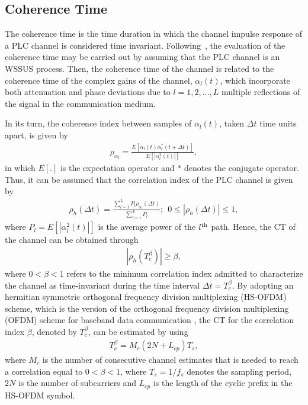 \documentclass[journal]{IEEEtran}
\begin{document}
	\subsection{Coherence Time}
	The coherence time is the time duration in which the channel impulse response of a PLC channel is considered time invariant. Following~\cite{Picorone2014}, the evaluation of the coherence time may be carried out by assuming that the PLC channel is an \ac{WSSUS} process. Then, the coherence time of the channel is related to the coherence time of the complex gains of the channel, $\alpha_l(t)$, which incorporate both attenuation and phase deviations due to $l = 1,2,\ldots,L$ multiple reflections of the signal in the communication medium.  
	
	In its turn, the coherence index between samples of $\alpha_l(t)$, taken $\Delta t$ time units apart, is given by
	\begin{eqnarray}\label{eq-correlindex}
	\rho_{\alpha_l}=\frac{E[\alpha_l(t)\alpha^*_l(t+\Delta t)]}{E[|\alpha_l^2(t)|]},
	\end{eqnarray}
	in which $E[.]$ is the expectation operator and $*$ denotes the conjugate operator. 
	Thus, it can be assumed that the correlation index of the PLC channel is given by
	\begin{eqnarray}\label{eq-correl}
	\rho_{h}(\Delta t)=\frac{\sum_{l=1}^L P_l \rho_{\alpha_l}(\Delta t)}{\sum_{l=1}^L P_l}; \ \ 0\leq |\rho_h(\Delta t)|\leq 1,
	\end{eqnarray}
	where $P_l= E[|\alpha_l^2(t)|]$ is the average power of the  $l^{\rm th}$ path. Hence, the CT of the channel can be obtained through
	\begin{eqnarray}\label{eq-correlfinal}
	|\rho_h(T_c^{\beta})|\geq \beta,
	\end{eqnarray}
	where $0 <\beta < 1$ refers to the minimum correlation index admitted to characterize the channel as time-invariant during the time interval $\Delta t =T_c^{\beta}$. By adopting an hermitian symmetric orthogonal frequency division multiplexing (HS-OFDM) scheme, which is the version of the orthogonal frequency division multiplexing (OFDM) scheme for baseband data communication \cite{Ribeiro2014a}, the CT for the correlation index $\beta$, denoted by $T_{c}^{\beta}$, can be estimated by using~\cite{Picorone2014} 
	\begin{eqnarray}
	T_{c}^{\beta} = M_c(2N+L_{cp})T_s,
	\end{eqnarray}
	where $M_c$ is the number of consecutive channel estimates that is needed to reach a correlation equal to $0<\beta<1$, where
	$T_s=1/f_s$ denotes the sampling period, $2N$ is the number of subcarriers and $L_{cp}$ is the length of the cyclic prefix in the HS-OFDM symbol.
	
\end{document}
